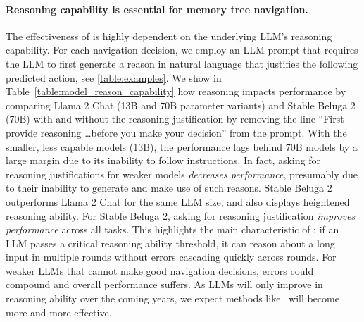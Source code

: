 \paragraph{Reasoning capability is essential for memory tree navigation.}
The effectiveness of \sysname{} is highly dependent on the underlying LLM's reasoning capability. 
For each navigation decision, we employ an LLM prompt that requires the LLM to first generate a reason in natural language that justifies the following predicted action, see \autoref{table:examples}.
We show in Table~\ref{table:model_reason_capability} how reasoning impacts performance by comparing Llama 2 Chat (13B and 70B parameter variants) and Stable Beluga 2 (70B)  with and without the reasoning justification by removing the 
line ``First provide reasoning \dots before you make your decision'' from the prompt. With the smaller, less capable models (13B), the performance lags behind 70B models by a large margin due to its inability to follow instructions. %
In fact, asking for reasoning justifications for weaker models 
{\em decreases performance}, presumably due to their inability to generate and make use of such reasons.
Stable Beluga 2 outperforms Llama 2 Chat for the same LLM size, and also displays heightened reasoning ability.
For Stable Beluga 2, asking for reasoning justification {\em improves performance} across all tasks.
This highlights the main characteristic of \sysname{}: if an LLM passes a critical reasoning ability threshold, it can reason about a long input in multiple rounds without errors cascading quickly across rounds. For weaker LLMs that cannot make good navigation decisions, 
errors could compound and overall performance suffers.
As LLMs will only improve in reasoning ability over the coming years, we expect methods like \sysname~will become more and more effective.

